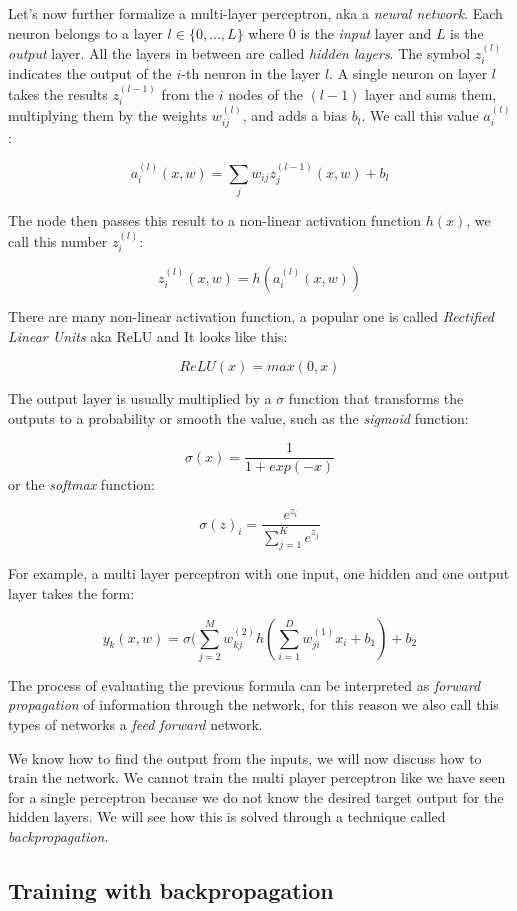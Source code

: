\documentclass{article}
\begin{document}
Let's now further formalize a multi-layer perceptron, aka a \emph{neural
network}. Each neuron belongs to a layer \(l\in \{ 0, ..., L \}\) where
\(0\) is the \emph{input} layer and \(L\) is the \emph{output} layer.
All the layers in between are called \emph{hidden layers}. The symbol
\(z^{(l)}_i\) indicates the output of the \(i\)-th neuron in the layer
\(l\). A single neuron on layer \(l\) takes the results
\(z_{i}^{(l-1)}\) from the \(i\) nodes of the \((l-1)\) layer and sums
them, multiplying them by the weights \(w_{ij}^{(l)}\), and adds a bias
\(b_l\). We call this value \(a_i^{(l)}\):

\[a_{i}^{(l)}(x, w)=\sum_j w_{ij}z_j^{(l-1)}(x, w)+b_l\]

The node then passes this result to a non-linear activation function
\(h(x)\), we call this number \(z_{i}^{(l)}\):

\[z_i^{(l)}(x, w)=h(a_i^{(l)}(x, w))\]

There are many non-linear activation function, a popular one is called
\emph{Rectified Linear Units} aka ReLU and It looks like this:

\[ReLU(x)=max(0, x)\]

The output layer is usually multiplied by a \(\sigma\) function that
transforms the outputs to a probability or smooth the value, such as the
\emph{sigmoid} function:

\[\sigma(x)= \frac{1}{1+exp(-x)}\] or the \emph{softmax} function:

\[\sigma (z)_i = \frac{e^{z_i}}{\sum_{j=1}^{K} e^{z_j}}\]

For example, a multi layer perceptron with one input, one hidden and one
output layer takes the form:

\[y_k(x, w)=\sigma (\sum_{j=2}^M w_{kj}^{(2)}h(\sum_{i=1}^D w_{ji}^{(1)}x_i + b_1) + b_{2}\]

The process of evaluating the previous formula can be interpreted as
\emph{forward propagation} of information through the network, for this
reason we also call this types of networks a \emph{feed forward}
network.

We know how to find the output from the inputs, we will now discuss how
to train the network. We cannot train the multi player perceptron like
we have seen for a single perceptron because we do not know the desired
target output for the hidden layers. We will see how this is solved
through a technique called \emph{backpropagation}.

\subsection{Training with
backpropagation}\label{training-with-backpropagation}
\end{document}
